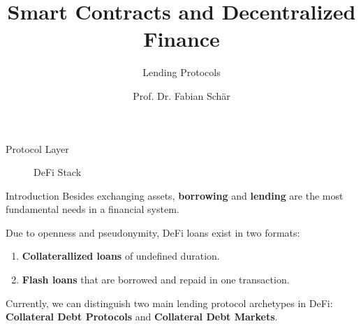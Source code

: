 \documentclass[]{beamer}
\title{Smart Contracts and Decentralized Finance}
\subtitle{Lending Protocols}
\author{Prof. Dr. Fabian Schär}
\institute{University of Basel}
\begin{document}
\thispagestyle{empty}
\begin{frame}[noframenumbering]
	\titlepage
\end{frame}

\begin{frame}{Protocol Layer}

\begin{figure}[t]
	\centering
	\resizebox{0.9\textwidth}{!}{
	\begin{tikzpicture}[scale=1.0, every node/.style={scale=1.0}]
		
	\end{tikzpicture}}
	\caption{DeFi Stack \cite{FS:21}}
\end{figure}
	
\end{frame}


\begin{frame}{Introduction}
Besides exchanging assets, \textbf{borrowing} and \textbf{lending} are the most fundamental needs in a financial system. \\

\vspace{1em}

 {
Due to openness and pseudonymity, DeFi loans exist in two formats:
\vspace{0.5em}
\begin{enumerate}
  \item \textbf{Collaterallized loans} of undefined duration.
  \item \textbf{Flash loans} that are borrowed and repaid in one transaction. 
\end{enumerate} 
}

 {
\vspace{1em}
Currently, we can distinguish two main lending protocol archetypes in DeFi: \textbf{Collateral Debt Protocols} and \textbf{Collateral Debt Markets}.
}
	
\end{frame}
\end{document}
